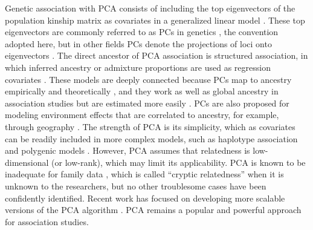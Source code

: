 \documentclass[11pt]{article}
\begin{document}
\begin{linenumbers}
Genetic association with PCA consists of including the top eigenvectors of the population kinship matrix as covariates in a generalized linear model \citep{zhang_semiparametric_2003, price_principal_2006, bouaziz_accounting_2011}.
These top eigenvectors are commonly referred to as PCs in genetics \citep{patterson_population_2006}, the convention adopted here, but in other fields PCs denote the projections of loci onto eigenvectors \citep{jolliffe_principal_2002}.
The direct ancestor of PCA association is structured association, in which inferred ancestry or admixture proportions are used as regression covariates \citep{pritchard_association_2000}.
These models are deeply connected because PCs map to ancestry empirically \citep{alexander_fast_2009, zhou_strong_2016} and theoretically \citep{mcvean_genealogical_2009,zheng_eigenanalysis_2016,cabreros_likelihood-free_2019,chiu_inferring_2022}, and they work as well as global ancestry in association studies but are estimated more easily \citep{patterson_population_2006, zhao_arabidopsis_2007, alexander_fast_2009, bouaziz_accounting_2011}.
PCs are also proposed for modeling environment effects that are correlated to ancestry, for example, through geography \citep{novembre_genes_2008, zhang_principal_2015, lin_admixed_2021}.
The strength of PCA is its simplicity, which as covariates can be readily included in more complex models, such as haplotype association \citep{xu_detecting_2014} and polygenic models \citep{qian_fast_2020}.
However, PCA assumes that relatedness is low-dimensional (or low-rank), which may limit its applicability.
PCA is known to be inadequate for family data \citep{patterson_population_2006, thornton_roadtrips:_2010, price_new_2010}, which is called ``cryptic relatedness'' when it is unknown to the researchers, but no other troublesome cases have been confidently identified.
Recent work has focused on developing more scalable versions of the PCA algorithm \citep{lee_sparse_2012, abraham_fast_2014, galinsky_fast_2016, abraham_flashpca2:_2017, agrawal_scalable_2020}.
PCA remains a popular and powerful approach for association studies.


\end{linenumbers}
\end{document}
